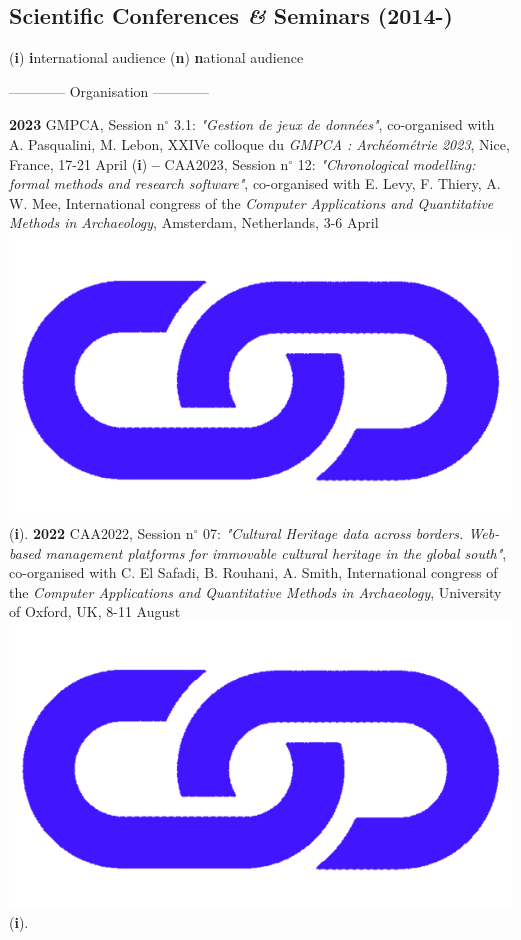 \documentclass{article}
\begin{document}
\subsection*{Scientific Conferences \textit{\&} Seminars (2014-)}
\begin{center}(\textbf{i}) \textbf{i}nternational audience {\textbar} (\textbf{n}) \textbf{n}ational audience \end{center}
\smallbreak
\begin{center}------------ Organisation ------------\end{center}
\textbf{2023 }GMPCA, Session n$\mathrm{{}^\circ}$ 3.1: \textit{"Gestion de jeux de données"}, co-organised with A. Pasqualini, M. Lebon, XXIVe colloque du \textit{GMPCA : Archéométrie 2023}, Nice, France, 17-21 April (\textbf{i})
\smallbreak
\textbf{-- }CAA2023, Session n$\mathrm{{}^\circ}$ 12: \textit{"Chronological modelling: formal methods and research software"}, co-organised with E. Levy, F. Thiery, A. W. Mee, International congress of the \textit{Computer Applications and Quantitative Methods in Archaeology}, Amsterdam, Netherlands, 3-6 April \href{https://historical-time.github.io/caa23/s12/pres/#/title-slide}{\includegraphics[scale=0.02]{link_darkblue.png}} (\textbf{i}).
\smallbreak
\textbf{2022 }CAA2022, Session n$\mathrm{{}^\circ}$ 07: \textit{"Cultural Heritage data across borders. Web-based management platforms for immovable cultural heritage in the global south"}, co-organised with C. El Safadi, B. Rouhani, A. Smith, International congress of the \textit{Computer Applications and Quantitative Methods in Archaeology}, University of Oxford, UK, 8-11 August \href{https://eamena-project.github.io/reveal.js/projects/caa22s07.html}{\includegraphics[scale=0.02]{link_darkblue.png}} (\textbf{i}). 
\end{document}
